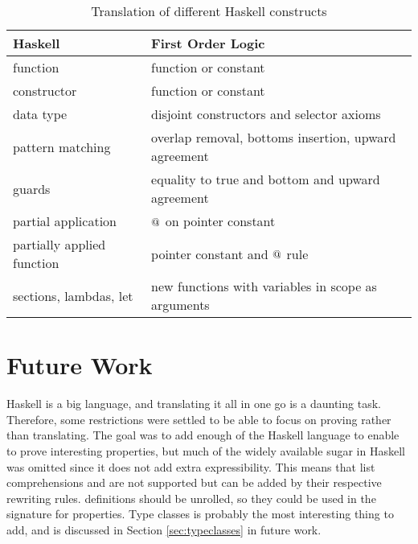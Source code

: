 \begin{table}[h]
  \centering
  \begin{tabular}{|l|l|}
    \hline
    Haskell                    & First Order Logic \\
    \hline
    function                   & function or constant \\
    constructor                & function or constant \\
    data type                  & disjoint constructors and selector axioms \\
    pattern matching           & overlap removal, bottoms insertion, upward agreement \\
    guards                     & equality to true and bottom and upward agreement \\
    partial application        & $@$ on pointer constant \\
    partially applied function & pointer constant and $@$ rule \\
    sections, lambdas, let     & new functions with variables in scope as arguments \\
    \hline
  \end{tabular}
  \caption{Translation of different Haskell constructs
    \label{tab:transtable}
  }
\end{table}

%






\section{Future Work}

Haskell is a big language, and translating it all in one go is a
daunting task. Therefore, some restrictions were settled to be able to
focus on proving rather than translating.  The goal was to add enough
of the Haskell language to enable to prove interesting properties, but
much of the widely available sugar in Haskell was omitted since it
does not add extra expressibility. This means that list comprehensions
and are not supported but can be added by their respective rewriting
rules.  definitions should be unrolled, so they could be
used in the signature for properties. Type classes is probably the
most interesting thing to add, and is discussed in Section
\ref{sec:typeclasses} in future work.

